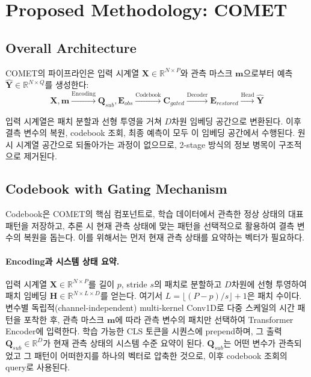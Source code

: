 
\section{Proposed Methodology: COMET}

\subsection{Overall Architecture}


COMET의 파이프라인은 입력 시계열 $\mathbf{X} \in \mathbb{R}^{N \times P}$와 관측 마스크 $\mathbf{m}$으로부터 예측 $\hat{\mathbf{Y}} \in \mathbb{R}^{N \times Q}$를 생성한다:
%
\begin{equation}
  \mathbf{X}, \mathbf{m}
    \xrightarrow{\text{Encoding}} \mathbf{Q}_{sub}, \mathbf{E}_{obs}
    \xrightarrow{\text{Codebook}} \mathbf{C}_{gated}
    \xrightarrow{\text{Decoder}} \mathbf{E}_{restored}
    \xrightarrow{\text{Head}} \hat{\mathbf{Y}}
\end{equation}

입력 시계열은 패치 분할과 선형 투영을 거쳐 $D$차원 임베딩 공간으로 변환된다. 이후 결측 변수의 복원, codebook 조회, 최종 예측이 모두 이 임베딩 공간에서 수행된다. 원시 시계열 공간으로 되돌아가는 과정이 없으므로, 2-stage 방식의 정보 병목이 구조적으로 제거된다.


\subsection{Codebook with Gating Mechanism}

Codebook은 COMET의 핵심 컴포넌트로, 학습 데이터에서 관측한 정상 상태의 대표 패턴을 저장하고, 추론 시 현재 관측 상태에 맞는 패턴을 선택적으로 활용하여 결측 변수의 복원을 돕는다. 이를 위해서는 먼저 현재 관측 상태를 요약하는 벡터가 필요하다.

\paragraph{Encoding과 시스템 상태 요약.}
입력 시계열 $\mathbf{X} \in \mathbb{R}^{N \times P}$를 길이 $p$, stride $s$의 패치로 분할하고 $D$차원에 선형 투영하여 패치 임베딩 $\mathbf{H} \in \mathbb{R}^{N \times L \times D}$를 얻는다. 여기서 $L = \lfloor(P - p)/s\rfloor + 1$은 패치 수이다. 변수별 독립적(channel-independent) multi-kernel Conv1D로 다중 스케일의 시간 패턴을 포착한 후, 관측 마스크 $\mathbf{m}$에 따라 관측 변수의 패치만 선택하여 Transformer Encoder에 입력한다. 학습 가능한 CLS 토큰을 시퀀스에 prepend하며, 그 출력 $\mathbf{Q}_{sub} \in \mathbb{R}^D$가 현재 관측 상태의 시스템 수준 요약이 된다. $\mathbf{Q}_{sub}$는 어떤 변수가 관측되었고 그 패턴이 어떠한지를 하나의 벡터로 압축한 것으로, 이후 codebook 조회의 query로 사용된다.

